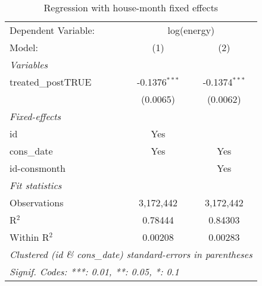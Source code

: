 
\begin{table}[htbp]
   \centering
   \caption{Regression with house-month fixed effects\label{tab:hm}}
   \begin{tabular}{lcc}
      \tabularnewline\midrule\midrule
      Dependent Variable: & \multicolumn{2}{c}{log(energy)}\\
      Model:             & (1)             & (2)\\
      \midrule \emph{Variables} &   &  \\
      treated\_postTRUE & -0.1376$^{***}$ & -0.1374$^{***}$\\
                         & (0.0065)        & (0.0062)\\
      \midrule \emph{Fixed-effects} &   &  \\
      id                 & Yes             & \\
      cons\_date        & Yes             & Yes\\
      id-consmonth       &                 & Yes\\
      \midrule \emph{Fit statistics} &   &  \\
      Observations       & 3,172,442       & 3,172,442\\
      R$^2$              & 0.78444         & 0.84303\\
      Within R$^2$       & 0.00208         & 0.00283\\
      \midrule\midrule\multicolumn{3}{l}{\emph{Clustered (id \& cons\_date) standard-errors in parentheses}}\\
      \multicolumn{3}{l}{\emph{Signif. Codes: ***: 0.01, **: 0.05, *: 0.1}}\\
   \end{tabular}
\end{table}


